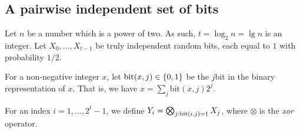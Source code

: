 \subsection{A pairwise independent set of bits}
%

Let $n$ be a number which is a power of two. As such,
$t = \log_2 n = \lg n$ is an integer.  Let $X_0, \ldots, X_{t-1}$ be truly
independent random bits, each equal to $1$ with probability $1/2$.

For a non-negative integer $x$, let
$\mathrm{bit}(x,j) \in \left\{ {0,1} \right\}$ be the $j$\th bit in the binary
representation of $x$. That is, we have
$x = \sum_{j} \mathrm{bit}(x,j)2^j$.

\newcommand{\bitY}[2]{\mathrm{bit}\pth{#1,#2}}%

For an index $i=1,\ldots, 2^{t}-1$, we define
$Y_i = \bigotimes_{j: \bitY{i}{j} = 1} X_j$, where $\otimes$ is the
\emph{xor} operator.

